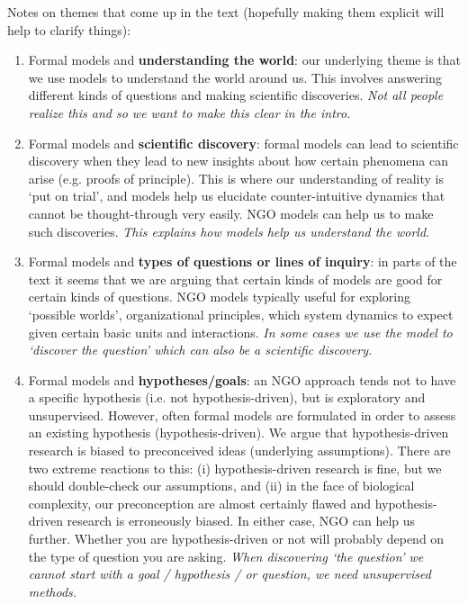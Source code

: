 Notes on themes that come up in the text (hopefully making them explicit will help to clarify things):
\begin{enumerate}
\item Formal models and \textbf{understanding the world}: our underlying theme is that we use models to understand the world around us. This involves answering different kinds of questions and making scientific discoveries. \textit{Not all people realize this and so we want to make this clear in the intro}.
\item Formal models and \textbf{scientific discovery}: formal models can lead to scientific discovery when they lead to new insights about how certain phenomena can arise (e.g. proofs of principle). This is where our understanding of reality is `put on trial', and models help us elucidate counter-intuitive dynamics that cannot be thought-through very easily. NGO models can help us to make such discoveries. \textit{This explains how models help us understand the world.}
\item Formal models and \textbf{types of questions or lines of inquiry}: in parts of the text it seems that we are arguing that certain kinds of models are good for certain kinds of questions. NGO models typically useful for exploring `possible worlds', organizational principles, which system dynamics to expect given certain basic units and interactions. \textit{In some cases we use the model to `discover the question' which can also be a scientific discovery.}
\item Formal models and \textbf{hypotheses/goals}: an NGO approach tends not to have a specific hypothesis (i.e. not hypothesis-driven), but is exploratory and unsupervised. However, often formal models are formulated in order to assess an existing hypothesis (hypothesis-driven). We argue that hypothesis-driven research is biased to preconceived ideas (underlying assumptions). There are two extreme reactions to this: (i) hypothesis-driven research is fine, but we should double-check our assumptions, and (ii) in the face of biological complexity, our preconception are almost certainly flawed and hypothesis-driven research is erroneously biased. In either case, NGO can help us further. Whether you are hypothesis-driven or not will probably depend on the type of question you are asking. \textit{When discovering `the question' we cannot start with a goal / hypothesis / or question, we need unsupervised methods.}

\end{enumerate}
